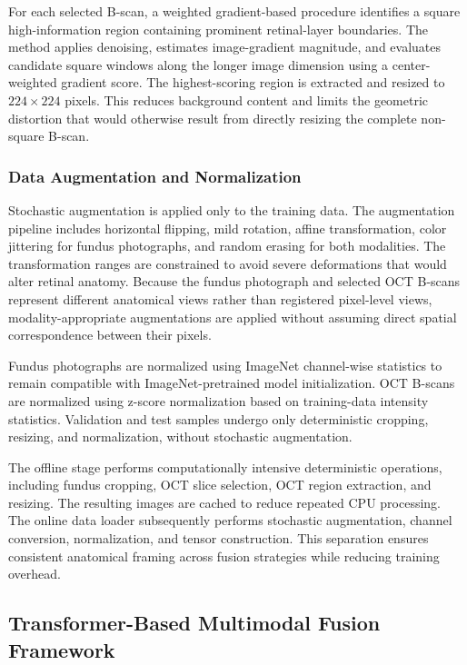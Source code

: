 \documentclass[preprint,12pt]{elsarticle}
\begin{document}
For each selected B-scan, a weighted gradient-based procedure identifies a square high-information region containing prominent retinal-layer boundaries. The method applies denoising, estimates image-gradient magnitude, and evaluates candidate square windows along the longer image dimension using a center-weighted gradient score. The highest-scoring region is extracted and resized to $224\times224$ pixels. This reduces background content and limits the geometric distortion that would otherwise result from directly resizing the complete non-square B-scan.

\subsubsection{Data Augmentation and Normalization}
\label{subsubsec:augmentation_normalization}

Stochastic augmentation is applied only to the training data. The augmentation pipeline includes horizontal flipping, mild rotation, affine transformation, color jittering for fundus photographs, and random erasing for both modalities. The transformation ranges are constrained to avoid severe deformations that would alter retinal anatomy. Because the fundus photograph and selected OCT B-scans represent different anatomical views rather than registered pixel-level views, modality-appropriate augmentations are applied without assuming direct spatial correspondence between their pixels.

Fundus photographs are normalized using ImageNet channel-wise statistics to remain compatible with ImageNet-pretrained model initialization. OCT B-scans are normalized using z-score normalization based on training-data intensity statistics. Validation and test samples undergo only deterministic cropping, resizing, and normalization, without stochastic augmentation.

The offline stage performs computationally intensive deterministic operations, including fundus cropping, OCT slice selection, OCT region extraction, and resizing. The resulting images are cached to reduce repeated CPU processing. The online data loader subsequently performs stochastic augmentation, channel conversion, normalization, and tensor construction. This separation ensures consistent anatomical framing across fusion strategies while reducing training overhead.

\subsection{Transformer-Based Multimodal Fusion Framework}
\label{subsec:fusion_framework}
\end{document}
